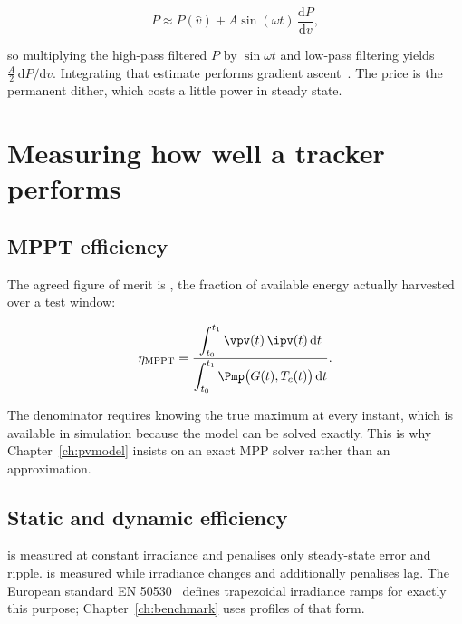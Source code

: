 \begin{equation}
P \approx P(\hat v) + A \sin(\omega t)\, \frac{\mathrm{d}P}{\mathrm{d}v},
\end{equation}

so multiplying the high-pass filtered $P$ by $\sin\omega t$ and low-pass
filtering yields $\tfrac{A}{2}\,\mathrm{d}P/\mathrm{d}v$. Integrating that
estimate performs gradient ascent~\cite{krstic,leyva}. The price is the
permanent dither, which costs a little power in steady state.

\section{Measuring how well a tracker performs}

\subsection{MPPT efficiency}

The agreed figure of merit is , the fraction of available
energy actually harvested over a test window:

\begin{equation}
\eta_{\mathrm{MPPT}} = \frac{\displaystyle\int_{t_0}^{t_1} \vpv(t)\, \ipv(t)\,\mathrm{d}t}
                            {\displaystyle\int_{t_0}^{t_1} \Pmp\big(G(t), T_c(t)\big)\,\mathrm{d}t} .
\label{eq:eta}
\end{equation}

The denominator requires knowing the true maximum at every instant, which is
available in simulation because the model can be solved exactly. This is why
Chapter~\ref{ch:pvmodel} insists on an exact MPP solver rather than an
approximation.

\subsection{Static and dynamic efficiency}

 is measured at constant irradiance and penalises
only steady-state error and ripple.  is measured
while irradiance changes and additionally penalises lag. The European standard
EN 50530~\cite{en50530} defines trapezoidal irradiance ramps for exactly this
purpose; Chapter~\ref{ch:benchmark} uses profiles of that form.
